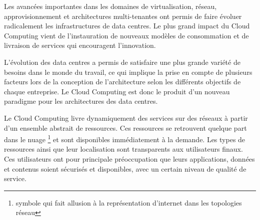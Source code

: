 \par
Les avancées importantes dans les domaines de virtualisation, réseau, approvisionnement et architectures multi-tenantes ont permis de faire évoluer radicalement les infrastructures de data centres. Le plus grand impact du Cloud Computing vient de l'instauration de nouveaux modèles de consommation et de livraison de services qui encouragent l'innovation.



L'évolution des data centres a permis de satisfaire une plus grande variété de besoins dans le monde du travail, ce qui implique la prise en compte de plusieurs facteurs lors de la conception de l'architecture selon les différents objectifs de chaque entreprise. Le Cloud Computing est donc le produit d'un nouveau paradigme pour les architectures des data centres.


Le Cloud Computing livre dynamiquement des services sur des réseaux à partir d'un ensemble abstrait de ressources. Ces ressources se retrouvent quelque part dans le \og nuage \fg{} \footnote{symbole qui fait allusion à la représentation d'internet dans les topologies réseau} et sont disponibles immédiatement à la demande. Les types de ressources ainsi que leur localisation sont transparents aux utilisateurs finaux. Ces utilisateurs ont pour principale préoccupation que leurs applications, données et contenus soient sécurisés et disponibles, avec un certain niveau de qualité de service.


